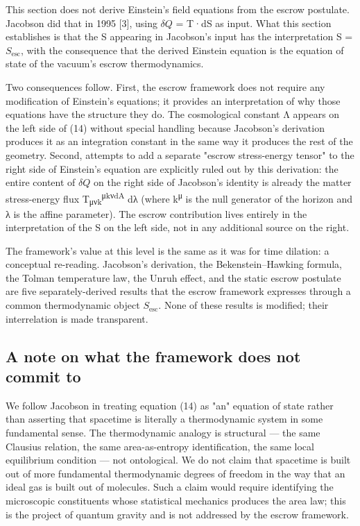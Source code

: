 \documentclass[11pt]{article}
\begin{document}
This section does not derive Einstein's field equations from the escrow
postulate. Jacobson did that in 1995 [3], using $\delta Q$ = T·dS as input.
What this section establishes is that the S appearing in Jacobson's
input has the interpretation S = $S_{\mathrm{esc}}$, with the consequence that the
derived Einstein equation is the equation of state of the vacuum's
escrow thermodynamics.

Two consequences follow. First, the escrow framework does not require
any modification of Einstein's equations; it provides an interpretation
of why those equations have the structure they do. The cosmological
constant Λ appears on the left side of (14) without special handling
because Jacobson's derivation produces it as an integration constant in
the same way it produces the rest of the geometry. Second, attempts to
add a separate "escrow stress-energy tensor" to the right side of
Einstein's equation are explicitly ruled out by this derivation: the
entire content of $\delta Q$ on the right side of Jacobson's identity is
already the matter stress-energy flux T\textsubscript{μνk}\textsuperscript{μk}\textsuperscript{νdA} dλ (where k\textsuperscript{μ} is
the null generator of the horizon and λ is the affine parameter). The
escrow contribution lives entirely in the interpretation of the S on the
left side, not in any additional source on the right.

The framework's value at this level is the same as it was for time
dilation: a conceptual re-reading. Jacobson's derivation, the
Bekenstein--Hawking formula, the Tolman temperature law, the Unruh
effect, and the static escrow postulate are five separately-derived
results that the escrow framework expresses through a common
thermodynamic object $S_{\mathrm{esc}}$. None of these results is modified; their
interrelation is made transparent.


\subsection{A note on what the framework does not commit to}

We follow Jacobson in treating equation (14) as "an" equation of state
rather than asserting that spacetime is literally a thermodynamic system
in some fundamental sense. The thermodynamic analogy is structural ---
the same Clausius relation, the same area-as-entropy identification, the
same local equilibrium condition --- not ontological. We do not claim
that spacetime is built out of more fundamental thermodynamic degrees of
freedom in the way that an ideal gas is built out of molecules. Such a
claim would require identifying the microscopic constituents whose
statistical mechanics produces the area law; this is the project of
quantum gravity and is not addressed by the escrow framework.
\end{document}
